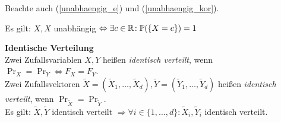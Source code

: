 Beachte auch (\ref{unabhaengig_e}) und (\ref{unabhaengig_kor}).

Es gilt: $X,X$ unabhängig $\Leftrightarrow \exists c\in\mathbb{R}\!: \mathbb{P}(\{X=c\}) = 1$

\textbf{Identische Verteilung}\\
Zwei Zufallsvariablen $X,Y$ heißen \textit{identisch verteilt},
wenn $\Pr_X = \Pr_Y \Leftrightarrow F_X = F_Y$.\\
Zwei Zufallsvektoren
$\tilde{X} = (\tilde{X}_1,\ldots,\tilde{X}_d),
\tilde{Y} = (\tilde{Y}_1,\ldots,\tilde{Y}_d)$
heißen \textit{identisch verteilt}, wenn
$\Pr_{\tilde{X}} = \Pr_{\tilde{Y}}$.\\
Es gilt: $\tilde{X},\tilde{Y}$ identisch verteilt
$\Rightarrow \forall i\in\{1,\ldots,d\}\!: \tilde{X}_i,\tilde{Y}_i$ identisch verteilt.

\clearpage
